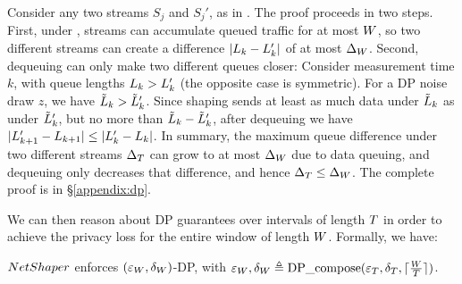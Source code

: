 \begin{proofsketch}
  Consider any two streams $S_j$ and $S_j'$, as in .
  The proof proceeds in two steps. First, under ,
  streams can accumulate queued traffic for at most {$W$}, so two
  different streams can create a difference $|L_{k} - L_{k}'|$ of at
  most $\Delta_{W}$.
  Second, dequeuing can only make two different queues closer: Consider
  measurement time $k$, with queue lengths $L_{k} > L_{k}'$ (the
  opposite case is symmetric).
  For a DP noise draw $z$, we have $\tilde{L}_{k} > \tilde{L}_{k}'$. Since shaping
  sends at least as much data under $\tilde{L}_{k}$ as under $\tilde{L}_{k}'$,
  but no more than $\tilde{L}_{k} - \tilde{L}_{k}'$, after dequeuing we have
  $|L_{k+1}' - L_{k+1}| \leq |L_{k}' - L_{k}|$.
  In summary, the maximum queue difference under two different streams
  $\Delta_T$ can grow to at most $\Delta_{W}$ due to data queuing, and dequeuing only
  decreases that difference, and hence $\Delta_T \leq \Delta_{W}$.  The complete proof
  is in \S\ref{appendix:dp}.
\end{proofsketch}

We can then reason about DP guarantees over intervals of length $T$ in
order to achieve the privacy loss for the entire window of length $W$.
%
Formally, we have:
\begin{proposition}\label{prop:dp}
  {${NetShaper}$} enforces $(\varepsilon_{W}, \delta_{W})$-DP, with
  $\varepsilon_{W}, \delta_{W} \triangleq
  \textrm{DP\_compose}(\varepsilon_T, \delta_T, \lceil \frac{W}{T} \rceil)$.
\end{proposition}

